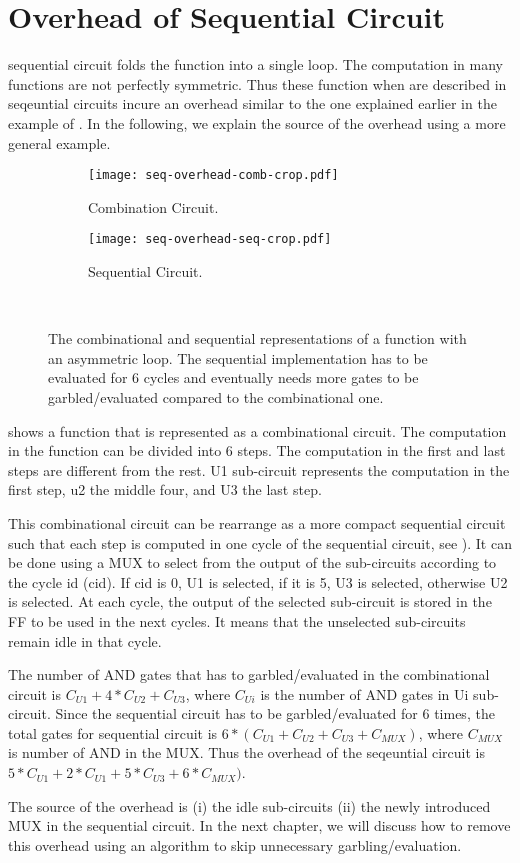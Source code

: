 \section{Overhead of Sequential Circuit}

sequential circuit folds the function into a single loop.
The computation in many functions are not perfectly symmetric.
Thus these function when are described in seqeuntial circuits incure an overhead similar to the one explained earlier in the example of .
In the following, we explain the source of the overhead using a more general example.

\begin{figure}[ht]
    \centering
    \begin{subfigure}[t]{0.8\textwidth}
        \texttt{[image: seq-overhead-comb-crop.pdf]}
        \caption{Combination Circuit.}\label{fig:seq-overhead-comb}
    \end{subfigure}
    \begin{subfigure}[t]{0.7\textwidth}
        \texttt{[image: seq-overhead-seq-crop.pdf]}
        \caption{Sequential Circuit.}\label{fig:seq-overhead-seq}
    \end{subfigure}\\
    \caption{The combinational and sequential representations of a function with an asymmetric loop.
    The sequential implementation has to be evaluated for 6 cycles and eventually needs more gates to be garbled/evaluated compared to the combinational one.}\label{fig:fig:seq-overhead-comb}
\end{figure}

 shows a function that is represented as a combinational circuit.
The computation in the function can be divided into 6 steps.
The computation in the first and last steps are different from the rest.
U1 sub-circuit represents the computation in the first step, u2 the middle four, and U3 the last step.

This combinational circuit can be rearrange as a more compact sequential circuit such that each step is computed in one cycle of the sequential circuit, see ).
It can be done using a MUX to select from the output of the sub-circuits according to the cycle id (cid).
If cid is 0, U1 is selected, if it is 5, U3 is selected, otherwise U2 is selected.
At each cycle, the output of the selected sub-circuit is stored in the FF to be used in the next cycles.
It means that the unselected sub-circuits remain idle in that cycle.

The number of AND gates that has to garbled/evaluated in the combinational circuit is $C_{U1}+4*C_{U2}+C_{U3}$, where $C_{Ui}$ is the number of AND gates in Ui sub-circuit.
Since the sequential circuit has to be garbled/evaluated for 6 times, the total gates for sequential circuit is $6*(C_{U1}+C_{U2}+C_{U3}+C_{MUX})$, where $C_{MUX}$ is number of AND in the MUX.
Thus the overhead of the seqeuntial circuit is $5*C_{U1}+2*C_{U1}+5*C_{U3}+6*C_{MUX})$.

The source of the overhead is (i) the idle sub-circuits (ii) the newly introduced MUX in the sequential circuit.
In the next chapter, we will discuss how to remove this overhead using an algorithm to skip unnecessary garbling/evaluation.
